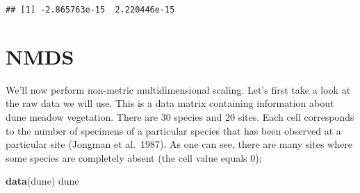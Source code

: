 \documentclass[
]{book}
\newenvironment{Shaded}{\begin{snugshade}}{\end{snugshade}}
\newcommand{\KeywordTok}[1]{\textcolor[rgb]{0.13,0.29,0.53}{\textbf{#1}}}
\newcommand{\NormalTok}[1]{#1}
\begin{document}
\begin{verbatim}
## [1] -2.865763e-15  2.220446e-15
\end{verbatim}

\hypertarget{nmds}{%
\section{NMDS}\label{nmds}}

We'll now perform non-metric multidimensional scaling. Let's first take a look at the raw data we will use. This is a data matrix containing information about dune meadow vegetation. There are 30 species and 20 sites. Each cell corresponds to the number of specimens of a particular species that has been observed at a particular site (Jongman et al.~1987). As one can see, there are many sites where some species are completely absent (the cell value equals 0):

\begin{Shaded}
\begin{Highlighting}[]
\KeywordTok{data}\NormalTok{(dune)}
\NormalTok{dune}
\end{Highlighting}
\end{Shaded}
\end{document}
